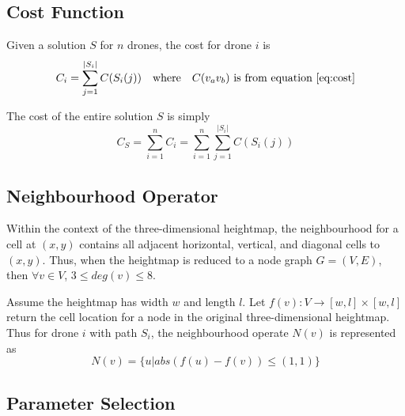 \documentclass[conference]{IEEEtran}
\begin{document}
\subsection{Cost Function}
Given a solution $S$ for $n$ drones, the cost for drone $i$ is 
\begin{equation} \label{eq:costdrone}
C_i = \sum_{j=1}^{|S_i|} C(S_i(j)) \quad \text{where} \quad C(v_av_b) \text{ is from equation \ref{eq:cost}}
\end{equation}

The cost of the entire solution $S$ is simply
\begin{equation} \label{eq:costsolution}
C_S = \sum_{i=1}^n C_i = \sum_{i=1}^n \sum_{j=1}^{|S_i|} C(S_i(j))
\end{equation}

\subsection{Neighbourhood Operator}
Within the context of the three-dimensional heightmap, the neighbourhood for a cell at $(x, y)$ contains all adjacent horizontal, vertical, and diagonal cells to $(x, y)$. Thus, when the heightmap is reduced to a node graph $G = (V, E)$, then $\forall v \in V$, $3 \leq deg(v) \leq 8$.

Assume the heightmap has width $w$ and length $l$. Let $f(v) : V \rightarrow [w, l] \times [w, l]$ return the cell location for a node in the original three-dimensional heightmap. Thus for drone $i$ with path $S_i$, the neighbourhood operate $N(v)$ is represented as
\begin{equation} \label{eq:neighbourhood}
N(v) = \{ u | abs(f(u) - f(v)) \leq (1, 1) \}
\end{equation}


\subsection{Parameter Selection}
\end{document}
